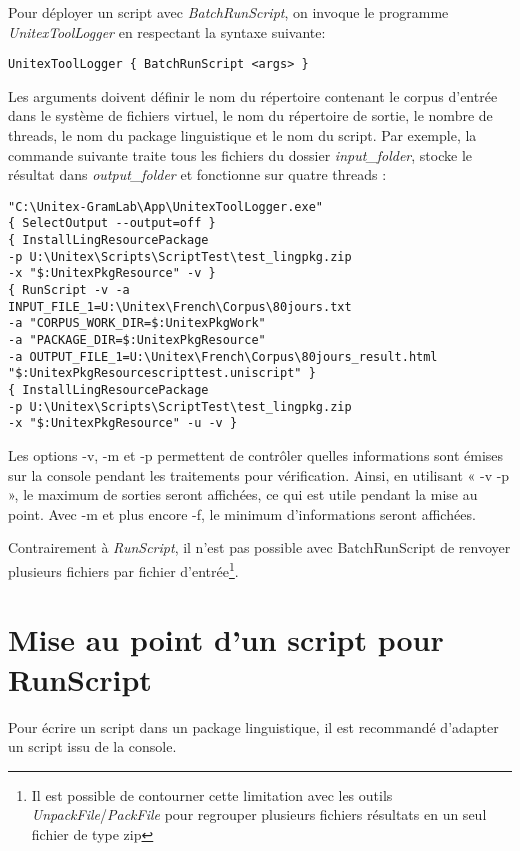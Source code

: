 \bigskip
\noindent Pour déployer un script avec \emph{BatchRunScript}, on invoque le programme \emph{UnitexToolLogger} en respectant la syntaxe suivante:

\begin{verbatim}
UnitexToolLogger { BatchRunScript <args> }
\end{verbatim}

\bigskip
\noindent Les arguments doivent définir le nom du répertoire contenant le corpus d'entrée dans le système de fichiers virtuel, le nom du répertoire de sortie, le nombre de threads, le nom du package linguistique et le nom du script. Par exemple, la commande suivante traite tous les fichiers du dossier \emph{input\_folder}, stocke le résultat dans \emph{output\_folder} et fonctionne sur quatre threads :

\begin{verbatim}
"C:\Unitex-GramLab\App\UnitexToolLogger.exe" 
{ SelectOutput --output=off } 
{ InstallLingResourcePackage 
-p U:\Unitex\Scripts\ScriptTest\test_lingpkg.zip 
-x "$:UnitexPkgResource" -v } 
{ RunScript -v -a 
INPUT_FILE_1=U:\Unitex\French\Corpus\80jours.txt 
-a "CORPUS_WORK_DIR=$:UnitexPkgWork" 
-a "PACKAGE_DIR=$:UnitexPkgResource" 
-a OUTPUT_FILE_1=U:\Unitex\French\Corpus\80jours_result.html 
"$:UnitexPkgResourcescripttest.uniscript" } 
{ InstallLingResourcePackage 
-p U:\Unitex\Scripts\ScriptTest\test_lingpkg.zip 
-x "$:UnitexPkgResource" -u -v }
\end{verbatim}

\bigskip
\noindent Les options -v, -m et -p permettent de contrôler quelles informations sont émises sur la console pendant les traitements pour vérification. Ainsi, en utilisant « -v -p », le maximum de sorties seront affichées, ce qui est utile pendant la mise au point. Avec -m et plus encore -f, le minimum d’informations seront affichées.

\bigskip
\noindent Contrairement à \emph{RunScript}, il n'est pas possible avec BatchRunScript de renvoyer plusieurs fichiers par fichier d'entrée\footnote{Il est possible de contourner cette limitation avec les outils \emph{UnpackFile}/\emph{PackFile} pour regrouper plusieurs fichiers résultats en un seul fichier de type zip}.

\section{Mise au point d'un script pour RunScript}

Pour écrire un script dans un package linguistique, il est recommandé d'adapter un script issu de la console.

